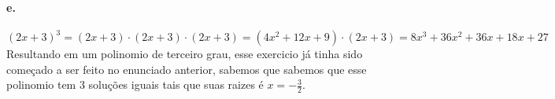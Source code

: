 	\paragraph{e.}
	\begin{equation}
	(2x+3)^3 = (2x+3) \cdot (2x+3) \cdot (2x+3) = (4x^2 + 12x + 9) \cdot (2x+3) = 8x^3 + 36x^2 + 36x + 18x + 27
	\end{equation}
	Resultando em um polinomio de terceiro grau, esse exercicio já tinha sido começado a ser feito no enunciado anterior, sabemos que sabemos que esse polinomio tem 3 soluções iguais tais que suas raizes é $x = -\frac{3}{2}$.

	
















